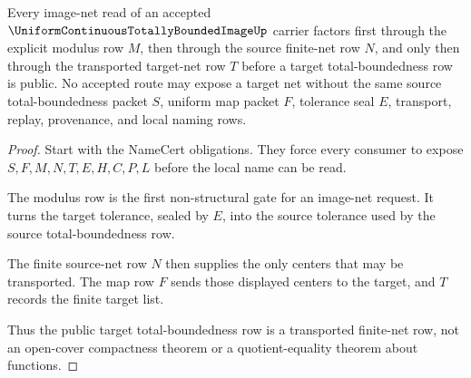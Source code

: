 \begin{theorem}
\label{thm:uniform-continuous-totally-bounded-image-route}
Every image-net read of an accepted $\UniformContinuousTotallyBoundedImageUp$ carrier factors first through the explicit modulus row $M$, then through the source finite-net row $N$, and only then through the transported target-net row $T$ before a target total-boundedness row is public. No accepted route may expose a target net without the same source total-boundedness packet $S$, uniform map packet $F$, tolerance seal $E$, transport, replay, provenance, and local naming rows.
\end{theorem}
\begin{proof}
Start with the NameCert obligations. They force every consumer to expose $S,F,M,N,T,E,H,C,P,L$ before the local name can be read.

The modulus row is the first non-structural gate for an image-net request. It turns the target tolerance, sealed by $E$, into the source tolerance used by the source total-boundedness row.

The finite source-net row $N$ then supplies the only centers that may be transported. The map row $F$ sends those displayed centers to the target, and $T$ records the finite target list.

Thus the public target total-boundedness row is a transported finite-net row, not an open-cover compactness theorem or a quotient-equality theorem about functions.
\end{proof}




